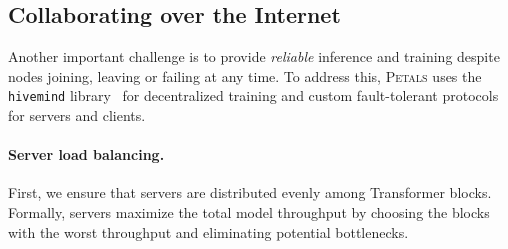 \begin{table}[tb]
\centering
\caption{Generation throughput (tokens/s) for BLOOM-176B on 8 A100 GPUs with 8-bit and 16-bit weights.}
\vspace{-5pt}
\label{tbl:memory_footprint}
\vspace{-10pt}
\label{tab:throughput}
\end{table}




\subsection{Collaborating over the Internet}\label{sect:networking}

Another important challenge is to provide \textit{reliable} inference and training despite nodes joining, leaving or failing at any time. To address this, \textsc{Petals} uses the \texttt{hivemind} library~\cite{hivemind} for decentralized training and custom fault-tolerant protocols for servers and clients.


\paragraph{Server load balancing.} First, we ensure that servers are distributed evenly among Transformer blocks. Formally, servers maximize the total model throughput by choosing the blocks with the worst throughput and eliminating potential bottlenecks.

